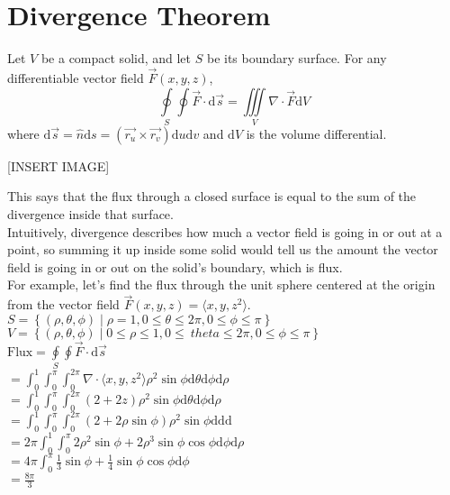 \section{Divergence Theorem}
\begin{theorem}
	Let $V$ be a compact solid, and let $S$ be its boundary surface. For any differentiable vector field $\vec{F}(x,y,z)$,
	\begin{equation*}
		\oint\limits_{S}{\oint{\vec{F} \cdot \mathrm{d}\vec{s}}} = \iiint\limits_{V}{\nabla \cdot \vec{F}\mathrm{d}V}
	\end{equation*}
	where $\mathrm{d}\vec{s} = \hat{n}\mathrm{d}s = (\vec{r_u}\times\vec{r_v})\mathrm{d}u\mathrm{d}v$ and $\mathrm{d}V$ is the volume differential.
\end{theorem}

[INSERT IMAGE]

\noindent
This says that the flux through a closed surface is equal to the sum of the divergence inside that surface.\\
Intuitively, divergence describes how much a vector field is going in or out at a point, so summing it up inside some solid would tell us the amount the vector field is going in or out on the solid’s boundary, which is flux.\\

\noindent
For example, let’s find the flux through the unit sphere centered at the origin from the vector field $\vec{F}(x,y,z) = \langle x, y, z^2 \rangle$.\\
\indent
$S = \left\{(\rho, \theta, \phi) \mid \rho=1, 0 \leq \theta \leq 2\pi, 0 \leq \phi \leq \pi \right\}$\\
\indent
$V = \left\{(\rho, \theta, \phi) \mid 0 \leq \rho \leq 1, 0 \leq\ theta \leq 2\pi, 0 \leq \phi \leq \pi \right\}$\\
\indent
$\text{Flux} = \oint\limits_{S}{\oint{\vec{F} \cdot \mathrm{d}\vec{s}}}$\\
\indent
$= \int_{0}^{1}{\int_{0}^{\pi}{\int_{0}^{2\pi}{\nabla \cdot \langle x, y, z^2 \rangle\rho^2\sin{\phi}\mathrm{d}\theta}\mathrm{d}\phi}\mathrm{d}\rho}$\\
\indent
$= \int_{0}^{1}{\int_{0}^{\pi}{\int_{0}^{2\pi}{(2 + 2z)\rho^2\sin{\phi}\mathrm{d}\theta}\mathrm{d}\phi}\mathrm{d}\rho}$\\
\indent
$= \int_{0}^{1}{\int_{0}^{\pi}{\int_{0}^{2\pi}{(2 + 2\rho\sin{\phi})\rho^2\sin{\phi}\mathrm{d}}\mathrm{d}}\mathrm{d}}$\\
\indent
$= 2\pi\int_{0}^{1}{\int_{0}^{\pi}{2\rho^2\sin{\phi} + 2\rho^3\sin{\phi}\cos{\phi}\mathrm{d}\phi}\mathrm{d}\rho}$\\
\indent
$= 4\pi\int_{0}^{\pi}{\frac{1}{3}\sin{\phi} + \frac{1}{4}\sin{\phi}\cos{\phi}\mathrm{d}\phi}$\\
\indent
$= \frac{8\pi}{3}$

